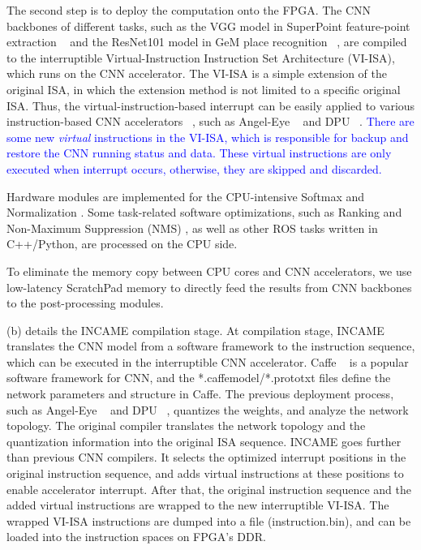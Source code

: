 The second step is to deploy the computation onto the FPGA. 
The CNN backbones of different tasks, such as the VGG model in SuperPoint feature-point extraction  ~\cite{detone2018superpoint} and the ResNet101 model in GeM place recognition  ~\cite{radenovic2018fine}, are compiled to the interruptible Virtual-Instruction Instruction Set Architecture (VI-ISA), which runs on the CNN accelerator. The VI-ISA is a simple extension of the original ISA, in which the extension method is not limited to a specific original ISA. Thus, the virtual-instruction-based interrupt can be easily applied to various instruction-based CNN accelerators  ~\cite{yu2018instruction,qiu2016going}, such as Angel-Eye ~\cite{guo2017angel} and DPU ~\cite{dpu}.
\textcolor{blue}{
There are some new \textit{virtual} instructions in the VI-ISA, which is responsible for backup and restore the CNN running status and data.  These virtual instructions are only executed when interrupt occurs, otherwise, they are skipped and discarded.
}


Hardware modules are implemented for the CPU-intensive Softmax  \cite{Softmax-wiki} and Normalization  \cite{Norm}. Some task-related software optimizations, such as Ranking and Non-Maximum Suppression (NMS)  \cite{NeubeckGool-NMS}, as well as other ROS tasks written in C++/Python, are processed on the CPU side.

To eliminate the memory copy between CPU cores and CNN accelerators, we use low-latency ScratchPad memory  \cite{Banakar2002Scratchpad} to directly feed the results from CNN backbones to the post-processing modules. 

(b) details the INCAME compilation stage. At compilation stage, INCAME translates the CNN model from a software framework to the instruction sequence, which can be executed in the interruptible CNN accelerator. Caffe  ~\cite{jia2014caffe} is a popular software framework for CNN, and the *.caffemodel/*.prototxt files define the network parameters and structure in Caffe. The previous deployment process, such as Angel-Eye  ~\cite{guo2017angel} and DPU ~\cite{dpu}, quantizes the weights, and analyze the network topology. The original compiler translates the network topology and the quantization information into the original ISA sequence. INCAME goes further than previous CNN compilers. It selects the optimized interrupt positions in the original instruction sequence, and adds virtual instructions at these positions to enable accelerator interrupt. After that, the original instruction sequence and the added virtual instructions are wrapped to the new interruptible VI-ISA. The wrapped VI-ISA instructions are dumped into a file (instruction.bin), and can be loaded into the instruction spaces on FPGA's DDR.


